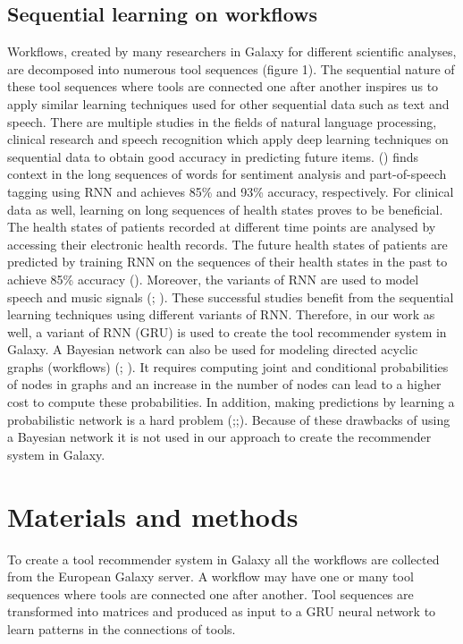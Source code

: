 \documentclass{bioinfo}
\begin{document}
\subsection{Sequential learning on workflows}
Workflows, created by many researchers in Galaxy for different scientific analyses, are decomposed into numerous tool sequences (figure 1). The sequential nature of these tool sequences where tools are connected one after another inspires us to apply similar learning techniques used for other sequential data such as text and speech. There are multiple studies in the fields of natural language processing, clinical research and speech recognition which apply deep learning techniques on sequential data to obtain good accuracy in predicting future items. (\cite{Yin2017ComparativeSO}) finds context in the long sequences of words for sentiment analysis and part-of-speech tagging using RNN and achieves 85\% and 93\% accuracy, respectively. For clinical data as well, learning on long sequences of health states proves to be beneficial. The health states of patients recorded at different time points are analysed by accessing their electronic health records. The future health states of patients are predicted by training RNN on the sequences of their health states in the past to achieve 85\% accuracy (\cite{Lipton2016a}). Moreover, the variants of RNN are used to model speech and music signals (\cite{ChungGCB14}; \cite{BoulangerLewandowski2012ModelingTD}). These successful studies benefit from the sequential learning techniques using different variants of RNN. Therefore, in our work as well, a variant of RNN (GRU) is used to create the tool recommender system in Galaxy. A Bayesian network can also be used for modeling directed acyclic graphs (workflows) (\cite{KaranBN}; \cite{Spirtes2000ConstructingBN}). It requires computing joint and conditional probabilities of nodes in graphs and an increase in the number of nodes can lead to a higher cost to compute these probabilities. In addition, making predictions by learning a probabilistic network is a hard problem (\cite{Chickering};\cite{Cooper};\cite{Chickering2004}). Because of these drawbacks of using a Bayesian network it is not used in our approach to create the recommender system in Galaxy.

\section{Materials and methods}
To create a tool recommender system in Galaxy all the workflows are collected from the European Galaxy server. A workflow may have one or many tool sequences where tools are connected one after another. Tool sequences are transformed into matrices and produced as input to a GRU neural network to learn patterns in the connections of tools.
\end{document}
